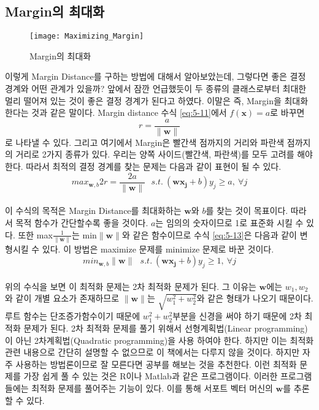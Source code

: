 \documentclass[a4paper]{oblivoir}
\begin{document}
\subsection{Margin의 최대화}
\begin{figure}[ht]\centering
\texttt{[image: Maximizing\_Margin]}\caption{Margin의 최대화}\label{Fig:5-7}
\end{figure}
\indent 이렇게 Margin Distance를 구하는 방법에 대해서 알아보았는데, 그렇다면 좋은 결정 경계와 어떤 관계가 있을까? 앞에서 잠깐 언급했듯이 두 종류의 클래스로부터 최대한 멀리 떨어져 있는 것이 좋은 결정 경계가 된다고 하였다. 이말은 즉, Margin을 최대화 한다는 것과 같은 말이다. Margin distance 수식 \eqref{eq:5-11}에서 $f(\mathbf{x})=a$로 바꾸면 $$r=\frac{a}{\lVert \mathbf{w}\rVert}$$로 나타낼 수 있다. 그리고 여기에서 Margin은 빨간색 점까지의 거리와 파란색 점까지의 거리로 2가지 종류가 있다. 우리는 양쪽 사이드(빨간색, 파란색)를 모두 고려를 해야 한다. 따라서 최적의 결정 경계를 찾는 문제는 다음과 같이 표현이 될 수 있다.\\
\begin{equation}
max_{\mathbf{w},b} 2r=\frac{2a}{\lVert \mathbf{w}\rVert}\ \ \ s.t.\ (\mathbf{wx_j}+b)y_j\geq a,\ \forall j
\label{eq:5-12}
\end{equation}\\
이 수식의 목적은 Margin Distance를 최대화하는 $\mathbf{w}$와 $b$를 찾는 것이 목표이다. 따라서 목적 함수가 간단할수록 좋을 것이다. $a$는 임의의 숫자이므로 1로 표준화 시킬 수 있다. 또한 max$\frac{1}{\lVert \mathbf{w}\rVert}$는 min$\lVert \mathbf{w}\rVert$와 같은 함수이므로 수식 \eqref{eq:5-13}은 다음과 같이 변형시킬 수 있다. 이 방법은 maximize 문제를 minimize 문제로 바꾼 것이다.\\
\begin{equation}
min_{\mathbf{w},b} {\lVert \mathbf{w}\rVert}\ \ \ s.t.\ (\mathbf{wx_j}+b)y_j\geq 1,\ \forall j
\label{eq:5-13}
\end{equation}\\
\indent 위의 수식을 보면 이 최적화 문제는 2차 최적화 문제가 된다. 그 이유는 $\mathbf{w}$에는 $w_1,w_2$와 같이 개별 요소가 존재하므로 $\lVert \mathbf{w}\rVert$는 $\sqrt{w_1^2+w_2^2}$와 같은 형태가 나오기 때문이다. 루트 함수는 단조증가함수이기 때문에 $w_1^2+w_2^2$부분을 신경을 써야 하기 때문에 2차 최적화 문제가 된다. 2차 최적화 문제를 풀기 위해서 선형계획법(Linear programming)이 아닌 2차계획법(Quadratic programming)을 사용 하여야 한다. 하지만 이는 최적화 관련 내용으로 간단히 설명할 수 없으므로 이 책에서는 다루지 않을 것이다. 하지만 자주 사용하는 방법론이므로 잘 모른다면 공부를 해보는 것을 추천한다. 이런 최적화 문제를 가장 쉽게 풀 수 있는 것은 R이나 Matlab과 같은 프로그램이다. 이러한 프로그램들에는 최적화 문제를 풀어주는 기능이 있다. 이를 통해 서포트 벡터 머신의 $\mathbf{w}$를 추론할 수 있다.\\
\end{document}
